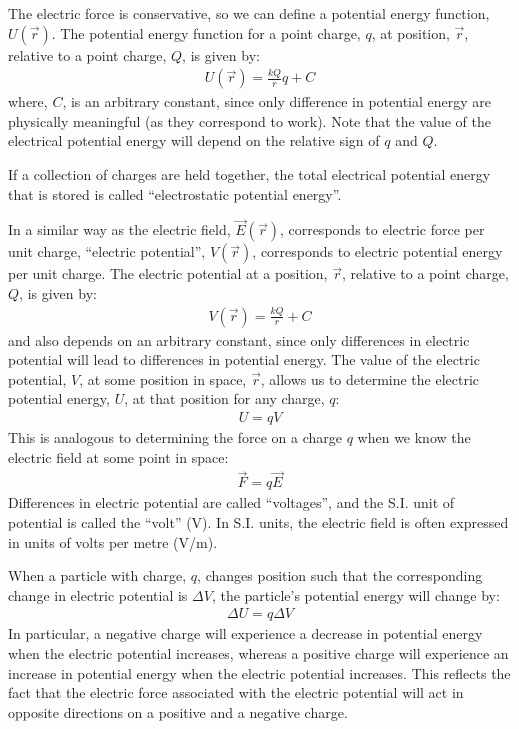 \begin{chapterSummary}
The electric force is conservative, so we can define a potential energy function, $U(\vec r)$. The potential energy function for a point charge, $q$, at position, $\vec r$, relative to a point charge, $Q$, is given by:
\begin{align*}
U(\vec r) = \frac{kQ}{r}q + C
\end{align*}
where, $C$, is an arbitrary constant, since only difference in potential energy are physically meaningful (as they correspond to work). Note that the value of the electrical potential energy will depend on the relative sign of $q$ and $Q$. 

If a collection of charges are held together, the total electrical potential energy that is stored is called ``electrostatic potential energy''. 

In a similar way as the electric field, $\vec E(\vec r)$, corresponds to electric force per unit charge, ``electric potential'', $V(\vec r)$, corresponds to electric potential energy per unit charge. The electric potential at a position, $\vec r$, relative to a point charge, $Q$, is given by:
\begin{align*}
V(\vec r) = \frac{kQ}{r} + C
\end{align*}
and also depends on an arbitrary constant, since only differences in electric potential will lead to differences in potential energy. The value of the electric potential, $V$, at some position in space, $\vec r$, allows us to determine the electric potential energy, $U$, at that position for any charge, $q$:
\begin{align*}
U = qV
\end{align*}
This is analogous to determining the force on a charge $q$ when we know the electric field at some point in space:
\begin{align*}
\vec F = q \vec E
\end{align*}
Differences in electric potential are called ``voltages'', and the S.I. unit of potential is called the ``volt'' (V). In S.I. units, the electric field is often expressed in units of volts per metre (V/m).

When a particle with charge, $q$, changes position such that the corresponding change in electric potential is $\Delta V$, the particle's potential energy will change by:
\begin{align*}
\Delta U = q\Delta V
\end{align*}
In particular, a negative charge will experience a decrease in potential energy when the electric potential increases, whereas a positive charge will experience an increase in potential energy when the electric potential increases. This reflects the fact that the electric force associated with the electric potential will act in opposite directions on a positive and a negative charge. 


\end{chapterSummary}
